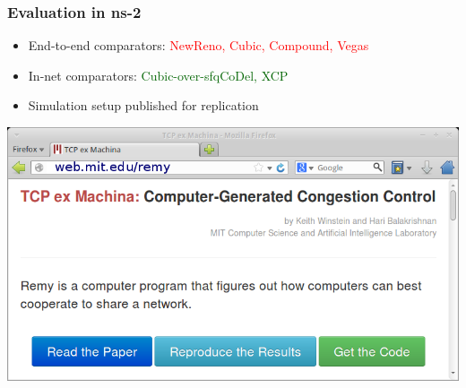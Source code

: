 \documentclass[svgnames]{beamer}
\begin{document}
\begin{frame}
\frametitle{Evaluation in ns-2}

\begin{itemize}

\item End-to-end comparators: \textcolor{Red}{NewReno, Cubic, Compound, Vegas}

\item In-net comparators: \textcolor{DarkGreen}{Cubic-over-sfqCoDel, XCP}

\item Simulation setup published for replication

\end{itemize}

\begin{centering}
\includegraphics[width=9 cm]{reproducethis.png}

\end{centering}

\end{frame}

\end{document}
